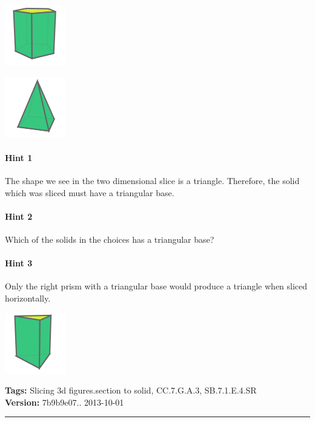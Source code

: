 \documentclass[twocolumn,10pt]{article}
\def\shrinkfactor{0.55}
\begin{document}
\includegraphics[scale=\shrinkfactor]{figures/714aa411c23dfb02df032183d703d78050ecb5ae.png}


\includegraphics[scale=\shrinkfactor]{figures/8e0bce39d089e690c82fd2275ed9e00339fd8202.png}



\paragraph{Hint 1}The shape we see in the two dimensional slice is a triangle. Therefore, the solid which was sliced must have a triangular base. 

\paragraph{Hint 2}Which of the solids in the choices has a triangular base?

\paragraph{Hint 3}Only the right prism with a triangular base would produce a triangle when sliced horizontally.


\includegraphics[scale=\shrinkfactor]{figures/df7e52cb3a541015199076ff457ee6bdda3a663c.png}



\medskip
\noindent
\textbf{Tags:} {\footnotesize Slicing 3d figures.section to solid, CC.7.G.A.3, SB.7.1.E.4.SR}\\
\textbf{Version:} 7b9b9e07.. 2013-10-01
\smallskip\hrule
\end{document}
